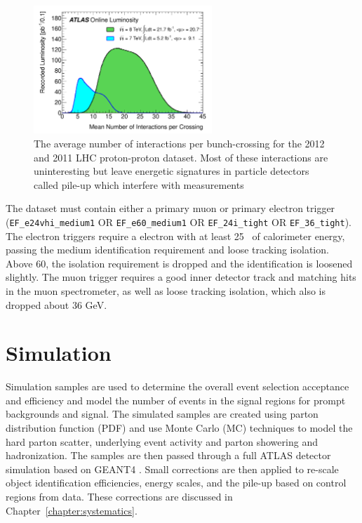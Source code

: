 \begin{figure}[!t]
\centering 
\includegraphics[width=0.60\textwidth]{figs/data/mu_2011_2012-dec.pdf}
\caption{ The average number of interactions per bunch-crossing for the 2012 and 2011 LHC proton-proton dataset. Most of these interactions are uninteresting but leave energetic signatures in particle detectors called pile-up which interfere with measurements}\label{figure:data_pileup}
\end{figure} 

The dataset must contain either a primary muon or primary electron trigger 
(\texttt{EF\_e24vhi\_medium1} OR \texttt{EF\_e60\_medium1} OR \texttt{EF\_24i\_tight} OR \texttt{EF\_36\_tight}). 
The electron triggers require a electron
with at least 25 \gev\ of calorimeter energy, passing the medium identification
requirement and loose tracking isolation.  Above 60\gev, the isolation
requirement is dropped and the identification is loosened slightly. 
The muon trigger requires a good inner detector track and matching
hits in the muon spectrometer, as well as loose tracking isolation,
which also is dropped about 36 GeV.  
            
\section{Simulation}

Simulation samples are used to determine the 
overall event selection acceptance and efficiency and model the number of events in the signal regions
for prompt backgrounds and signal. The simulated samples are created using parton distribution function (PDF) and
use Monte Carlo (MC) techniques to model the hard parton scatter, underlying event activity and parton showering and hadronization. 
The samples are then passed through a full ATLAS detector simulation\cite{Aad:2010ah} based on \textsc{GEANT4} \cite{Agostinelli:2002hh}.
Small corrections are then applied to re-scale object identification efficiencies,
energy scales, and the pile-up based on control regions from data. These corrections are discussed in Chapter~\ref{chapter:systematics}. 

